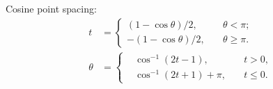 \documentclass[a4paper,12pt]{article}
\begin{document}
Cosine point spacing:
\begin{subequations}
  \begin{align}
    t &=
    \left\{
      \begin{aligned}
        (1-\cos\theta)/2,  & \quad\theta < \pi;\\
        -(1-\cos\theta)/2, & \quad\theta \geq \pi.
      \end{aligned}
    \right.\\
    \theta &=
    \left\{
    \begin{aligned}
      &\cos^{-1}(2t-1), &\quad t > 0,\\
      &\cos^{-1}(2t+1) + \pi, &\quad t \leq 0.
    \end{aligned}
    \right.
  \end{align}
\end{subequations}





\end{document}
